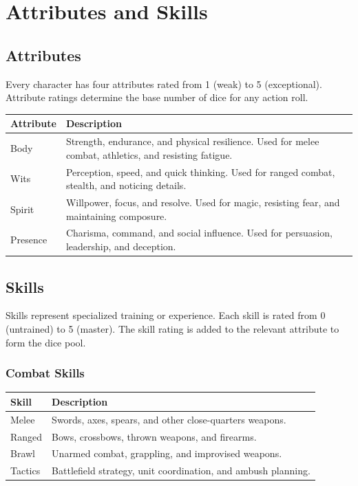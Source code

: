 
\section{Attributes and Skills}

\subsection{Attributes}

Every character has four attributes rated from 1 (weak) to 5 (exceptional). Attribute ratings determine the base number of dice for any action roll.

\begin{tabular}{@{}lp{10cm}@{}}
\toprule
\textbf{Attribute} & \textbf{Description} \\
\midrule
Body & Strength, endurance, and physical resilience. Used for melee combat, athletics, and resisting fatigue. \\
Wits & Perception, speed, and quick thinking. Used for ranged combat, stealth, and noticing details. \\
Spirit & Willpower, focus, and resolve. Used for magic, resisting fear, and maintaining composure. \\
Presence & Charisma, command, and social influence. Used for persuasion, leadership, and deception. \\
\bottomrule
\end{tabular}

\subsection{Skills}

Skills represent specialized training or experience. Each skill is rated from 0 (untrained) to 5 (master). The skill rating is added to the relevant attribute to form the dice pool.

\subsubsection{Combat Skills}

\begin{tabular}{@{}lp{10cm}@{}}
\toprule
\textbf{Skill} & \textbf{Description} \\
\midrule
Melee & Swords, axes, spears, and other close-quarters weapons. \\
Ranged & Bows, crossbows, thrown weapons, and firearms. \\
Brawl & Unarmed combat, grappling, and improvised weapons. \\
Tactics & Battlefield strategy, unit coordination, and ambush planning. \\
\bottomrule
\end{tabular}

